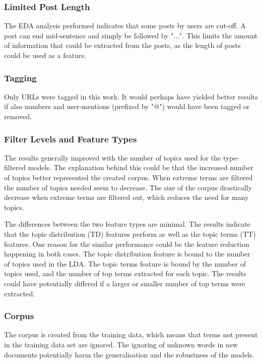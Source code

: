 \subsubsection{Limited Post Length}
The EDA analysis performed indicates that some posts by users are cut-off.
A post can end mid-sentence and simply be followed by "$\ldots$".
This limits the amount of information that could be extracted from the posts, as the length of posts could be used as a feature.

\subsubsection{Tagging}
Only URLs were tagged in this work.
It would perhaps have yielded better results if also numbers and user-mentions (prefixed by "@") would have been tagged or removed.

\subsubsection{Filter Levels and Feature Types}
The results generally improved with the number of topics used for the type-filtered models.
The explanation behind this could be that the increased number of topics better represented the created corpus.
When extreme terms are filtered the number of topics needed seem to decrease.
The size of the corpus drastically decrease when extreme terms are filtered out, which reduces the need for many topics.

The differences between the two feature types are minimal.
The results indicate that the topic distribution (TD) features perform as well as the topic terms (TT) features.
One reason for the similar performance could be the feature reduction happening in both cases.
The topic distribution feature is bound to the number of topics used in the LDA.
The topic terms feature is bound by the number of topics used, and the number of top terms extracted for each topic.
The results could have potentially differed if a larger or smaller number of top terms were extracted.

\subsubsection{Corpus}
The corpus is created from the training data, which means that terms not present in the training data set are ignored.
The ignoring of unknown words in new documents potentially harm the generalisation and the robustness of the models.


